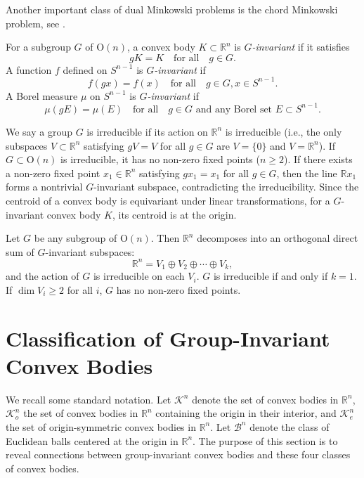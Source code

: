 \documentclass[12pt, reqno]{amsart}
\theoremstyle{definition}
\theoremstyle{remark}
\numberwithin{equation}{section}
\newcommand{\Sn}{S^{n-1}}
\newcommand{\On}{\mathrm{O}(n)}
\begin{document}
	Another important class of dual Minkowski problems is the  chord Minkowski problem, see \cite{guoxizhao,LYZX chord,li chord,xyzz2023}.
	
	For a subgroup $G$ of $\On$,  a convex body $K \subset \mathbb{R}^n$ is \textit{$G$-invariant} if it satisfies
	\[
	gK= K \quad \text{for all} \quad g \in G.
	\]
	A function $f$ defined on $\Sn$ is \textit{$G$-invariant} if
	\[
	f(gx) = f(x) \quad \text{for all} \quad g \in G, x\in \Sn.
	\]
	A Borel measure $\mu$ on $S^{n-1}$ is \textit{$G$-invariant} if
	\[
	\mu(gE) = \mu(E) \quad \text{for all}\quad g \in G \text{ and any Borel set } E \subset S^{n-1}.
	\]
	
	
	We say a group $G$ is irreducible if its action on $\mathbb{R}^n$ is irreducible  (i.e., the only subspaces $V \subset \mathbb{R}^n$ satisfying $gV = V$ for all $g \in G$ are $V = \{0\}$ and $V = \mathbb{R}^n$).
	If $G\subset \On$ is irreducible, it has no non-zero fixed points ($n\ge2$). If there exists a non-zero fixed point $x_1 \in \mathbb{R}^n$ satisfying $gx_1 = x_1$ for all $g \in G$, then the line $\mathbb{R}x_1$ forms a nontrivial $G$-invariant subspace, contradicting the irreducibility. Since the centroid  of a convex body is equivariant under linear transformations,  for a $G$-invariant convex body $K$, its centroid is  at the origin.
		
		
		
		Let $G $ be any subgroup of $\On$.  Then $\mathbb{R}^n$ decomposes into an orthogonal direct sum of $G$-invariant subspaces:
		\[
		\mathbb{R}^n = V_1 \oplus V_2 \oplus \cdots \oplus V_k,
		\]
		and	the action of $G$ is irreducible on each $V_i$.  $G$ is irreducible if and only if $k=1$.
		If $\dim V_{i} \geq 2$ for all $i$, $G$ has no non-zero fixed points.
		
		
	

	
	\vspace{1\baselineskip} 
\section{Classification of Group-Invariant Convex Bodies}\label{classification}
	
	We recall some standard notation. Let $\mathcal{K}^n$ denote the set of convex bodies in $\mathbb{R}^n$, 
	$\mathcal{K}_o^n$ the set of convex bodies in $\mathbb{R}^n$ containing the origin in their interior, 
	and $\mathcal{K}_e^n$ the set of origin-symmetric convex bodies in $\mathbb{R}^n$. 
	Let $\mathcal{B}^n$ denote the class of Euclidean balls centered at the origin in $\mathbb{R}^n$. 
	The purpose of this section is to reveal connections between group-invariant convex bodies and these four classes of convex bodies. 

	
\end{document}
